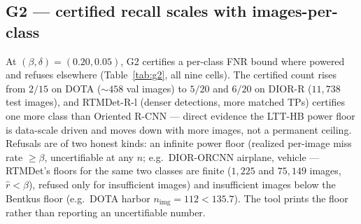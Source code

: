 \documentclass[11pt]{article}
\begin{document}
\subsection{G2 --- certified recall scales with images-per-class}
At $(\beta,\delta)=(0.20,0.05)$, G2 certifies a per-class FNR bound where powered and refuses
elsewhere (Table~\ref{tab:g2}, all nine cells). The certified count rises from $2/15$ on DOTA ($\sim458$ val images) to
$5/20$ and $6/20$ on DIOR-R ($11{,}738$ test images), and RTMDet-R-l (denser detections, more matched TPs)
certifies one more class than Oriented R-CNN --- direct evidence the LTT-HB power floor is data-scale
driven and moves down with more images, not a permanent ceiling. Refusals are of two honest kinds: an
infinite power floor (realized per-image miss rate $\ge\beta$, uncertifiable at any $n$; e.g.\
DIOR-ORCNN airplane, vehicle --- RTMDet's floors for the same two classes are finite ($1{,}225$ and
$75{,}149$ images, $\hat r<\beta$), refused only for insufficient images) and insufficient images
below the Bentkus floor (e.g.\ DOTA harbor $n_{\mathrm{img}}{=}112<135.7$). The tool prints the floor rather than reporting an uncertifiable number.
\end{document}
